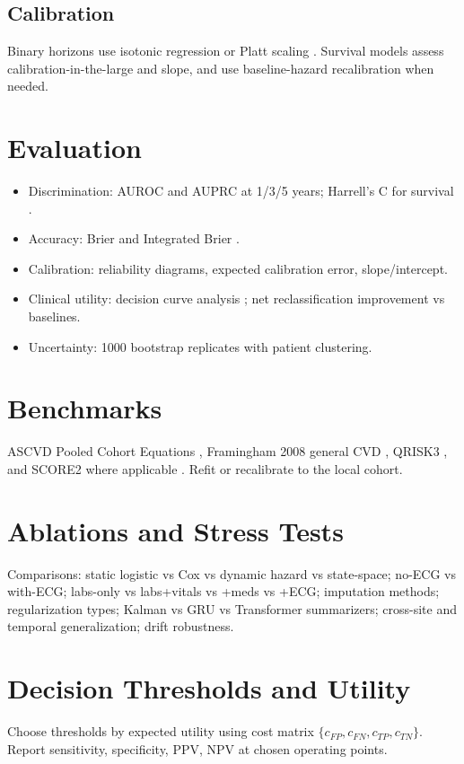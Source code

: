 \documentclass[11pt]{article}
\begin{document}
\subsection{Calibration}
Binary horizons use isotonic regression \cite{ZadroznyElkan2002} or Platt scaling \cite{Platt1999}. Survival models assess calibration-in-the-large and slope, and use baseline-hazard recalibration when needed.

\section{Evaluation}
\begin{itemize}[noitemsep]
  \item Discrimination: AUROC and AUPRC at 1/3/5 years; Harrell's C for survival \cite{Harrell1982}.
  \item Accuracy: Brier and Integrated Brier \cite{Brier1950}.
  \item Calibration: reliability diagrams, expected calibration error, slope/intercept.
  \item Clinical utility: decision curve analysis \cite{VickersElkin2006}; net reclassification improvement vs baselines.
  \item Uncertainty: 1000 bootstrap replicates with patient clustering.
\end{itemize}

\section{Benchmarks}
ASCVD Pooled Cohort Equations \cite{Goff2014}, Framingham 2008 general CVD \cite{DAgostino2008}, QRISK3 \cite{HippisleyCox2017}, and SCORE2 where applicable \cite{SCORE22021}. Refit or recalibrate to the local cohort.

\section{Ablations and Stress Tests}
Comparisons: static logistic vs Cox vs dynamic hazard vs state-space; no-ECG vs with-ECG; labs-only vs labs+vitals vs +meds vs +ECG; imputation methods; regularization types; Kalman vs GRU vs Transformer summarizers; cross-site and temporal generalization; drift robustness.

\section{Decision Thresholds and Utility}
Choose thresholds by expected utility using cost matrix \(\{c_{FP},c_{FN},c_{TP},c_{TN}\}\). Report sensitivity, specificity, PPV, NPV at chosen operating points.
\end{document}
